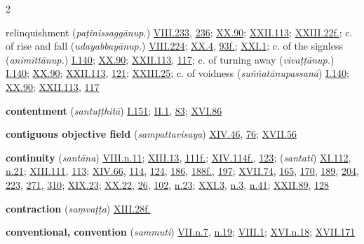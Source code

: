 \begin{multicols}{2}
\begin{vismHanging}
relinquishment (\emph{paṭinissaggānup.}) \hyperlink{VIII.233}{VIII.233}{}, \hyperlink{VIII.236}{236}{}; \hyperlink{XX.90}{XX.90}{}; \hyperlink{XXII.113}{XXII.113}{}; \hyperlink{XXIII.22}{XXIII.22f.}{}; c. of rise and fall (\emph{udayabbayānup.}) \hyperlink{VIII.224}{VIII.224}{}; \hyperlink{XX.4}{XX.4}{}, \hyperlink{XX.93}{93f.}{}; \hyperlink{XXI.1}{XXI.1}{}; c. of the signless (\emph{animittānup.}) \hyperlink{I.140}{I.140}{}; \hyperlink{XX.90}{XX.90}{}; \hyperlink{XXII.113}{XXII.113}{}, \hyperlink{XXII.117}{117}{}; c. of turning away (\emph{vivaṭṭānup.}) \hyperlink{I.140}{I.140}{}; \hyperlink{XX.90}{XX.90}{}; \hyperlink{XXII.113}{XXII.113}{}, \hyperlink{XXII.121}{121}{}; \hyperlink{XXIII.25}{XXIII.25}{}; c. of voidness (\emph{suññatānupassanā}) \hyperlink{I.140}{I.140}{}; \hyperlink{XX.90}{XX.90}{}; \hyperlink{XXII.113}{XXII.113}{}, \hyperlink{XXII.117}{117}{}
\par\textbf{contentment} (\emph{santuṭṭhitā}) \hyperlink{I.151}{I.151}{}; \hyperlink{II.1}{II.1}{}, \hyperlink{II.83}{83}{}; \hyperlink{XVI.86}{XVI.86}{}
\par\textbf{contiguous objective field} (\emph{sampattavisaya}) \hyperlink{XIV.46}{XIV.46}{}, \hyperlink{XIV.76}{76}{}; \hyperlink{XVII.56}{XVII.56}{}
\par\textbf{continuity} (\emph{santāna}) \hyperlink{VIII.n11}{VIII.n.11}{}; \hyperlink{XIII.13}{XIII.13}{}, \hyperlink{XIII.111}{111f.}{}; \hyperlink{XIV.114}{XIV.114f.}{}, \hyperlink{XIV.123}{123}{}; (\emph{santati}) \hyperlink{XI.112}{XI.112}{}, \hyperlink{XI.n21}{n.21}{}; \hyperlink{XIII.111}{XIII.111}{}, \hyperlink{XIII.113}{113}{}; \hyperlink{XIV.66}{XIV.66}{}, \hyperlink{XIV.114}{114}{}, \hyperlink{XIV.124}{124}{}, \hyperlink{XIV.186}{186}{}, \hyperlink{XIV.188}{188f.}{}, \hyperlink{XIV.197}{197}{}; \hyperlink{XVII.74}{XVII.74}{}, \hyperlink{XVII.165}{165}{}, \hyperlink{XVII.170}{170}{}, \hyperlink{XVII.189}{189}{}, \hyperlink{XVII.204}{204}{}, \hyperlink{XVII.223}{223}{}, \hyperlink{XVII.271}{271}{}, \hyperlink{XVII.310}{310}{}; \hyperlink{XIX.23}{XIX.23}{}; \hyperlink{XX.22}{XX.22}{}, \hyperlink{XX.26}{26}{}, \hyperlink{XX.102}{102}{}, \hyperlink{XX.n23}{n.23}{}; \hyperlink{XXI.3}{XXI.3}{}, \hyperlink{XXI.n3}{n.3}{}, \hyperlink{XXI.n41}{n.41}{}; \hyperlink{XXII.89}{XXII.89}{}, \hyperlink{XXII.128}{128}{}
\par\textbf{contraction} (\emph{saṃvaṭṭa}) \hyperlink{XIII.28}{XIII.28f.}{}
\par\textbf{conventional, convention} (\emph{sammuti}) \hyperlink{VII.n7}{VII.n.7}{}, \hyperlink{VII.n19}{n.19}{}; \hyperlink{VIII.1}{VIII.1}{}; \hyperlink{XVI.n18}{XVI.n.18}{}; \hyperlink{XVII.171}{XVII.171}{}

\end{vismHanging}
\end{multicols}
